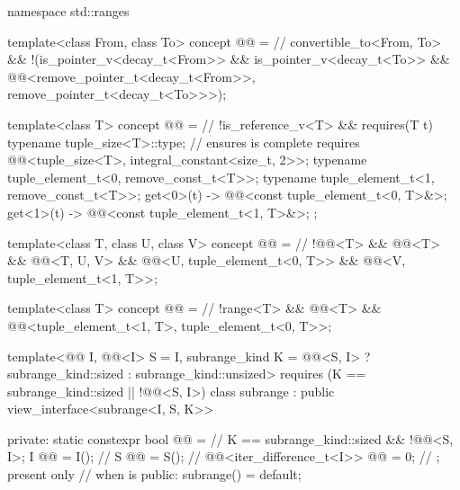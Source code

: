 %
\begin{codeblock}
namespace std::ranges {
  template<class From, class To>
    concept @@ =                    // \expos
      convertible_to<From, To> &&
      !(is_pointer_v<decay_t<From>> &&
        is_pointer_v<decay_t<To>> &&
        @@<remove_pointer_t<decay_t<From>>, remove_pointer_t<decay_t<To>>>);

  template<class T>
    concept @@ =                                     // \expos
      !is_reference_v<T> && requires(T t) {
        typename tuple_size<T>::type;                       // ensures  is complete
        requires @@<tuple_size<T>, integral_constant<size_t, 2>>;
        typename tuple_element_t<0, remove_const_t<T>>;
        typename tuple_element_t<1, remove_const_t<T>>;
        { get<0>(t) } -> @@<const tuple_element_t<0, T>&>;
        { get<1>(t) } -> @@<const tuple_element_t<1, T>&>;
      };

  template<class T, class U, class V>
    concept @@ =                    // \expos
      !@@<T> && @@<T> &&
      @@<T, U, V> &&
      @@<U, tuple_element_t<0, T>> &&
      @@<V, tuple_element_t<1, T>>;

  template<class T>
    concept @@ =                        // \expos
      !range<T> && @@<T> &&
      @@<tuple_element_t<1, T>, tuple_element_t<0, T>>;

  template<@@ I, @@<I> S = I, subrange_kind K =
      @@<S, I> ? subrange_kind::sized : subrange_kind::unsized>
    requires (K == subrange_kind::sized || !@@<S, I>)
  class subrange : public view_interface<subrange<I, S, K>> {
  private:
    static constexpr bool @@ =                           // \expos
      K == subrange_kind::sized && !@@<S, I>;
    I @@ = I();                                             // \expos
    S @@ = S();                                               // \expos
    @@<iter_difference_t<I>> @@ = 0;       // \expos; present only
                                                                // when  is 
  public:
    subrange() = default;

}}
\end{codeblock}
